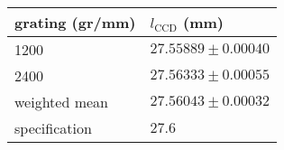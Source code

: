\begin{tabular}{ll}
\toprule
grating (gr/mm) & $l_\text{CCD}$ (mm) \\
\midrule
1200            & $27.55889 \pm 0.00040$ \\
2400            & $27.56333 \pm 0.00055$ \\
weighted mean   & $27.56043 \pm 0.00032$ \\
specification   & $27.6$ \\
\bottomrule
\end{tabular}
